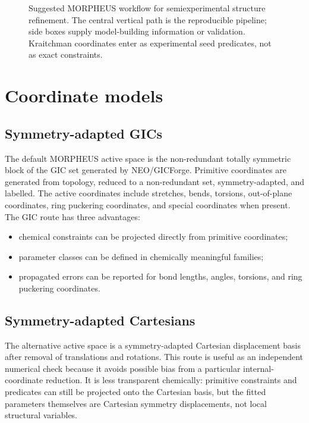 \documentclass[11pt]{article}
\begin{document}
\begin{figure}[t]
{%
}
\caption{Suggested MORPHEUS workflow for semiexperimental structure refinement.
The central vertical path is the reproducible pipeline; side boxes supply model-building
information or validation.  Kraitchman coordinates enter as experimental seed predicates,
not as exact constraints.}
\label{fig:morpheus-workflow}
\end{figure}

\section{Coordinate models}
\subsection{Symmetry-adapted GICs}
The default MORPHEUS active space is the non-redundant totally symmetric block of the
GIC set generated by NEO/GICForge.  Primitive coordinates are generated from topology,
reduced to a non-redundant set, symmetry-adapted, and labelled.  The active coordinates
include stretches, bends, torsions, out-of-plane coordinates, ring puckering coordinates,
and special coordinates when present.  The GIC route has three advantages:
\begin{itemize}
  \item chemical constraints can be projected directly from primitive coordinates;
  \item parameter classes can be defined in chemically meaningful families;
  \item propagated errors can be reported for bond lengths, angles, torsions, and ring
        puckering coordinates.
\end{itemize}

\subsection{Symmetry-adapted Cartesians}
The alternative active space is a symmetry-adapted Cartesian displacement basis after
removal of translations and rotations.  This route is useful as an independent numerical
check because it avoids possible bias from a particular internal-coordinate reduction.
It is less transparent chemically: primitive constraints and predicates can still be
projected onto the Cartesian basis, but the fitted parameters themselves are Cartesian
symmetry displacements, not local structural variables.
\end{document}
